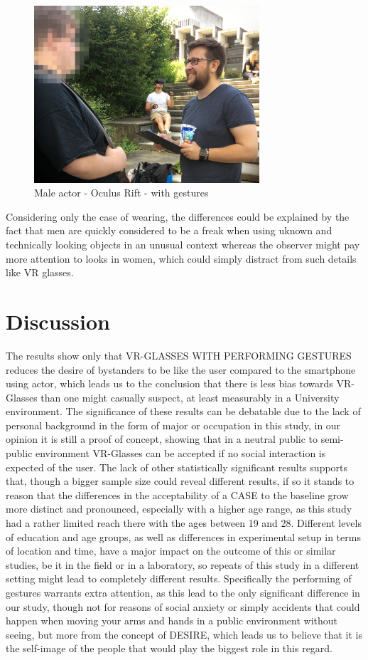 \documentclass[sigchi]{acmart}
\begin{document}
\begin{figure}[h]
\includegraphics[width=84mm]{IMG_5319_edited.jpg} 
\caption{Male actor - Oculus Rift - with gestures}
\end{figure}

Considering only the case of wearing, the differences could be explained by the fact that men are quickly considered to be a freak when using uknown and technically looking objects in an unusual context whereas the observer might pay more attention to looks in women, which could simply distract from such details like VR glasses.
 
\section {Discussion}
The results show only that VR-GLASSES WITH PERFORMING GESTURES reduces the desire of bystanders to be like the user compared to the smartphone using actor, which leads us to the conclusion that there is less bias towards VR-Glasses than one might casually suspect, at least measurably in a University environment. The significance of these results can be debatable due to the lack of personal background in the form of major or occupation in this study, in our opinion it is still a proof of concept, showing that in a neutral public to semi-public environment VR-Glasses can be accepted if no social interaction is expected of the user. The lack of other statistically significant results supports that, though a bigger sample size could reveal different results, if so it stands to reason that the differences in the acceptability of a CASE to the baseline grow more distinct and pronounced, especially with a higher age range, as this study had a rather limited reach there with the ages between 19 and 28. Different levels of education and age groups, as well as differences in experimental setup in terms of location and time, have a major impact on the outcome of this or similar studies, be it in the field or in a laboratory, so repeats of this study in a different setting might lead to completely different results. 
Specifically the performing of gestures warrants extra attention, as this lead to the only significant difference in our study, though not for reasons of social anxiety or simply accidents that could happen when moving your arms and hands in a public environment without seeing, but more from the concept of DESIRE, which leads us to believe that it is the self-image of the people that would play the biggest role in this regard.
\end{document}
